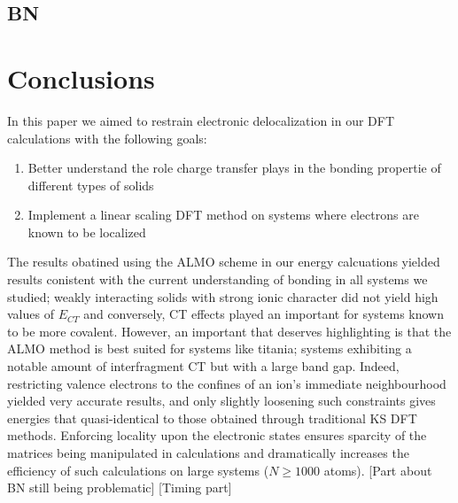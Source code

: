 \documentclass[aps,prb,twocolumn,amsmath,amssymb,superscriptaddress,longbibliography]{revtex4-1}
\newcommand{\Ns}{\mathbb{N}^{*}}
\begin{document}
 



\subsection*{BN}






\section{Conclusions} 

In this paper we aimed to restrain electronic delocalization in our DFT calculations with the following goals:
\begin{enumerate}
\item{Better understand the role charge transfer plays in the bonding propertie of different types of solids}
\item{Implement a linear scaling DFT method on systems where electrons are known to be localized}
\end{enumerate}
The results obatined using the ALMO scheme in our energy calcuations yielded results conistent with the current understanding of bonding in all systems we studied; weakly interacting solids with strong ionic character did not yield high values of $E_{CT}$ and conversely, CT effects played an important for systems known to be more covalent.
However, an important that deserves highlighting is that the ALMO method is best suited for systems like titania; systems exhibiting a notable amount of interfragment CT but with a large band gap. 
Indeed, restricting valence electrons to the confines of an ion's immediate neighbourhood yielded very accurate results, and only slightly loosening such constraints gives energies that quasi-identical to those obtained through traditional KS DFT methods. 
Enforcing locality upon the electronic states ensures sparcity of the matrices being manipulated in calculations and dramatically increases the efficiency of such calculations on large systems ($N\geq 1000$ atoms).
[Part about BN still being problematic]
[Timing part]
\end{document}
